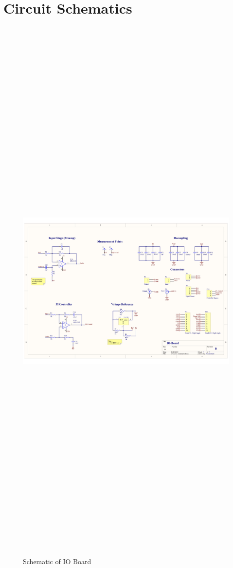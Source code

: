 \chapter{Circuit Schematics}
\begin{landscape}
	\begin{figure}[hbtp]
		\centering
		\includegraphics[width=20cm,height=28.7cm,keepaspectratio]{0_Figures/Appendix/IO_Board_Schematic.pdf}
		\caption{Schematic of IO Board \cite{multivar_ctrl_loops_for_SM_audio_systems}}
		\label{fig:schematic_io_board}
	\end{figure}
\end{landscape}
